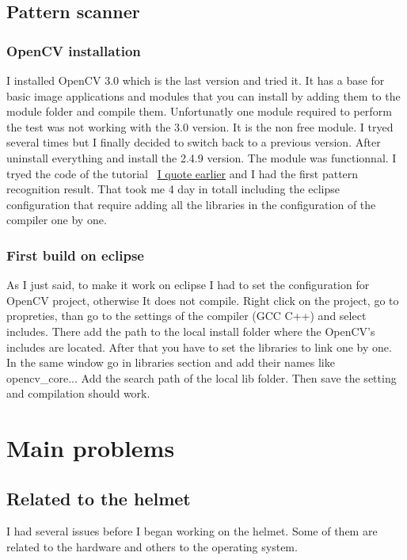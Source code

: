 	\subsection{Pattern scanner}
	\subsubsection{OpenCV installation}

	\par I installed OpenCV 3.0 which is the last version and tried it. It has a base for basic image applications and modules that you can install by adding them to the module folder and compile them. Unfortunatly one module required to perform the test was not working with the 3.0 version. It is the non free module. I tryed several times but I finally decided to switch back to a previous version. After uninstall everything and install the 2.4.9 version. The module was functionnal. I tryed the code of the tutorial ~\hyperlink{opencv}{I quote earlier} and I had the first pattern recognition result. That took me 4 day in totall including the eclipse configuration that require adding all the libraries in the configuration of the compiler one by one.
	
	\subsubsection{First build on eclipse}	
	
	\par As I just said, to make it work on eclipse I had to set the configuration for OpenCV project, otherwise It does not compile. Right click on the project, go to propreties, than go to the settings of the compiler (GCC  C++) and select includes. There add the path to the local install folder where the OpenCV's includes are located. After that you have to set the libraries to link one by one. In the same window go in libraries section and add their names like opencv\_core... Add the search path of the local lib folder. Then save the setting and compilation should work.
	
	
	\section{Main problems}	
	\subsection{Related to the helmet}
	\par I had several issues before I began working on the helmet. Some of them are related to the hardware and others to the operating system.

